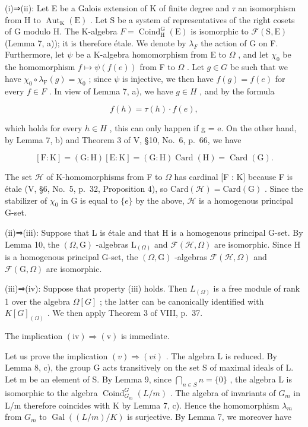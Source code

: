 (i)⇒(ii): Let E be a Galois extension of K of finite degree and \(\tau\) an isomorphism from H to \(\operatorname{Aut}_{\mathrm{K}}(\mathrm{E})\) . Let S be a system of representatives of the right cosets of G modulo H. The K-algebra \(F = \operatorname{Coind}_{\mathrm{H}}^{\mathrm{G}}(\mathrm{E})\) is isomorphic to \(\mathcal{F}(\mathrm{S}, \mathrm{E})\) (Lemma 7, a)); it is therefore étale. We denote by \(\lambda_{F}\) the action of G on F. Furthermore, let \(\psi\) be a K-algebra homomorphism from E to \(\Omega\) , and let \(\chi_{0}\) be the homomorphism \(f \mapsto \psi(f(e))\) from F to \(\Omega\) . Let \(g \in G\) be such that we have \(\chi_{0} \circ \lambda_{\mathrm{F}}(g) = \chi_{0}\) ; since \(\psi\) is injective, we then have \(f(g) = f(e)\) for every \(f \in F\) . In view of Lemma 7, a), we have \(g \in H\) , and by the formula

\[
f (h) = \tau (h) \cdot f (e),\tag{18}
\]

which holds for every \(h \in H\) , this can only happen if g = e. On the other hand, by Lemma 7, b) and Theorem 3 of V, §10, No.~6, p.~66, we have

\[
[ \mathrm{F}: \mathrm{K} ] = (\mathrm{G}: \mathrm{H}) [ \mathrm{E}: \mathrm{K} ] = (\mathrm{G}: \mathrm{H}) \operatorname{Card} (\mathrm{H}) = \operatorname{Card} (\mathrm{G}).
\]

The set \(\mathcal{H}\) of K-homomorphisms from F to \(\Omega\) has cardinal {[}F : K{]} because F is étale (V, §6, No.~5, p.~32, Proposition 4), so \(\mathrm{Card}(\mathcal{H}) = \mathrm{Card}(\mathrm{G})\) . Since the stabilizer of \(\chi_0\) in G is equal to \(\{e\}\) by the above, \(\mathcal{H}\) is a homogenous principal G-set.

(ii)⇒(iii): Suppose that L is étale and that H is a homogenous principal G-set. By Lemma 10, the \((\Omega,\mathrm{G})\) -algebras \(\mathrm{L}_{(\Omega)}\) and \(\mathcal{F}(\mathcal{H},\Omega)\) are isomorphic. Since H is a homogenous principal G-set, the \((\Omega,\mathrm{G})\) -algebras \(\mathcal{F}(\mathcal{H},\Omega)\) and \(\mathcal{F}(\mathrm{G},\Omega)\) are isomorphic.

(iii)⇒(iv): Suppose that property (iii) holds. Then \(L_{(\Omega)}\) is a free module of rank 1 over the algebra \(\Omega[G]\) ; the latter can be canonically identified with \(K[G]_{(\Omega)}\) . We then apply Theorem 3 of VIII, p.~37.

The implication \((\mathrm{iv})\Rightarrow (\mathrm{v})\) is immediate.

Let us prove the implication \((v)\Rightarrow(vi)\) . The algebra L is reduced. By Lemma 8, c), the group G acts transitively on the set S of maximal ideals of L. Let m be an element of S. By Lemma 9, since \(\bigcap_{n\in S}n=\{0\}\) , the algebra L is isomorphic to the algebra \(\operatorname{Coind}_{G_{m}}^{G}(L/m)\) . The algebra of invariants of \(G_{m}\) in L/m therefore coincides with K by Lemma 7, c). Hence the homomorphism \(\lambda_{m}\) from \(G_{m}\) to \(\operatorname{Gal}((L/m)/K)\) is surjective. By Lemma 7, we moreover have

